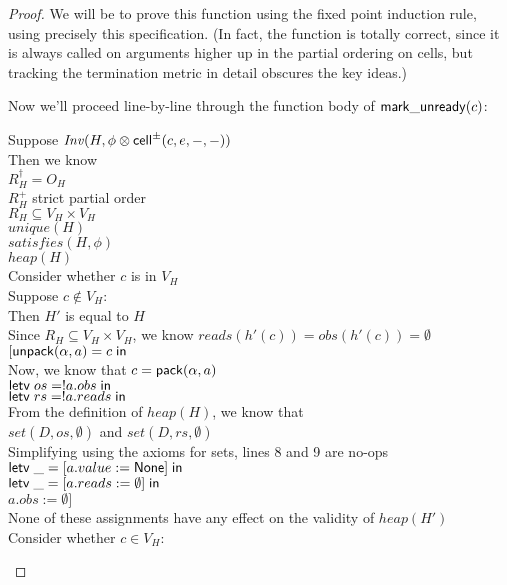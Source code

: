 \begin{proof}
We will be to prove this function using the fixed point induction
rule, using precisely this specification. (In fact, the function is
totally correct, since it is always called on arguments higher up in
the partial ordering on cells, but tracking the termination metric in
detail obscures the key ideas.)

Now we'll proceed line-by-line through the function body of $\mathsf{mark\_unready}(c)$: 

\begin{tabbedproof}
\oo Suppose $\mathit{Inv}(H, \phi \otimes \mathsf{cell}^{\pm}({c}, {e}, {-}, {-}))$ \\
\oo Then we know \\
\oox $R^\dagger_H = O_H$ \\
\oox $R^+_H$ strict partial order \\
\oox $R_H \subseteq V_H \times V_H$ \\
\oox $\mathit{unique}(H)$ \\
\oox $\mathit{satisfies}(H, \phi)$ \\
\oox $\mathit{heap}(H)$ \\
\ooo Consider whether $c$ is in $V_H$ \\
\ooo Suppose $c \not\in V_H$: \\
\oooo Then $H'$ is equal to $H$ \\
\oooo Since $R_H \subseteq V_H \times V_H$, we know $\mathit{reads}(h'(c)) = \mathit{obs}(h'(c)) = \emptyset$ \\
\oooo $[\mathsf{unpack}({\alpha}, {a}) = {c} \;\mathsf{in}\;{}$ \\
\oooo Now, we know that $c = \mathsf{pack}({\alpha}, {a})$ \\
\oooo $\mathsf{letv}\;os = !a.obs\;\mathsf{in}\;$ \\
\oooo $\mathsf{letv}\;rs = !a.reads\;\mathsf{in}\;$ \\
\oooo From the definition of $\mathit{heap}(H)$, we know that  \\
\oooo $\mathit{set}(D, os, \emptyset)$ and $\mathit{set}(D, rs, \emptyset)$ \\
\oooo Simplifying using the axioms for sets, lines 8 and 9 are no-ops \\
\oooo $\mathsf{letv}\;\_ = [a.value := \mathsf{None}]\;\mathsf{in}\;$ \\
\oooo $\mathsf{letv}\;\_ = [a.reads := \emptyset]\;\mathsf{in}\;$ \\
\oooo $a.obs := \emptyset]$ \\
\oooo None of these assignments have any effect on the validity of $\mathit{heap}(H')$ \\
\ooo Consider whether $c \in V_H$: \\

\end{tabbedproof}
\end{proof}
